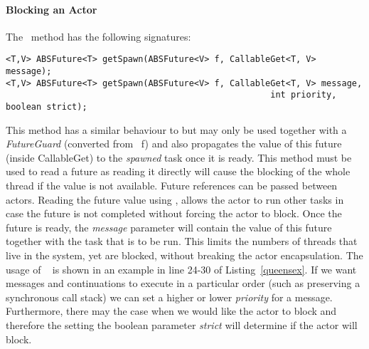 \paragraph{Blocking an Actor}
The \gspawn ~method has the following signatures:

\begin{lstlisting}
<T,V> ABSFuture<T> getSpawn(ABSFuture<V> f, CallableGet<T, V> message);
<T,V> ABSFuture<T> getSpawn(ABSFuture<V> f, CallableGet<T, V> message, 
													int priority, boolean strict);
\end{lstlisting}

This method has a similar behaviour to \spawn but may only be used together with a \textit{FutureGuard} (converted from \future ~f) and also propagates the value of this future (inside CallableGet) to the \textit{spawned} task once it is ready. This method must be used to read a future as reading it directly will cause the blocking of the whole thread if the value is not available.  Future references can be passed between actors. Reading the future value using \gspawn, allows the actor to run other tasks in case the future is not completed without forcing the actor to block. Once the future is ready, the \textit{message} parameter will contain the value of this future together with the task that is to be run. This limits the numbers of threads that live in the system, yet are blocked, without breaking the actor encapsulation. The usage of \gspawn~ is shown in an example in line 24-30 of Listing~\ref{queensex}. If we want messages and continuations to execute in a particular order (such as preserving a synchronous call stack) we can set a higher or lower \textit{priority} for a message.  Furthermore, there may the case when we would like the actor to block and therefore the setting the boolean parameter \textit{strict} will determine if the actor will block.  

